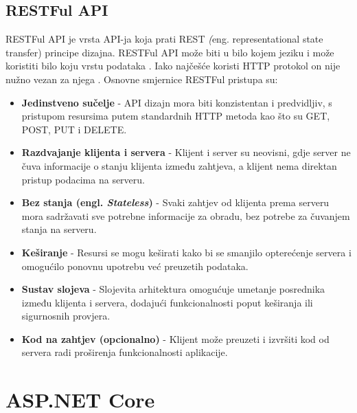\documentclass{foi}
\begin{document}
\subsection{RESTFul API}
RESTFul API je vrsta API-ja koja prati REST \textit(eng. {representational state transfer}) principe dizajna. RESTFul API može biti u bilo kojem jeziku i može koristiti bilo koju vrstu podataka \cite{ibm_rest_api}.
Iako najčešće koristi HTTP protokol on nije nužno vezan za njega \cite{Microsoft2023}. Osnovne smjernice RESTFul pristupa su:
\begin{itemize}
    \item \textbf{Jedinstveno sučelje} - API dizajn mora biti konzistentan i predvidljiv, s pristupom resursima putem standardnih HTTP metoda kao što su GET, POST, PUT i DELETE.
    
    \item \textbf{Razdvajanje klijenta i servera} - Klijent i server su neovisni, gdje server ne čuva informacije o stanju klijenta između zahtjeva, a klijent nema direktan pristup podacima na serveru.
    
    \item \textbf{Bez stanja (engl. \textit{Stateless})} - Svaki zahtjev od klijenta prema serveru mora sadržavati sve potrebne informacije za obradu, bez potrebe za čuvanjem stanja na serveru.
    
    \item \textbf{Keširanje} - Resursi se mogu keširati kako bi se smanjilo opterećenje servera i omogućilo ponovnu upotrebu već preuzetih podataka.
    
    \item \textbf{Sustav slojeva} - Slojevita arhitektura omogućuje umetanje posrednika između klijenta i servera, dodajući funkcionalnosti poput keširanja ili sigurnosnih provjera.
    
    \item \textbf{Kod na zahtjev (opcionalno)} - Klijent može preuzeti i izvršiti kod od servera radi proširenja funkcionalnosti aplikacije. 
\end{itemize}

\section{ASP.NET Core}
\end{document}

